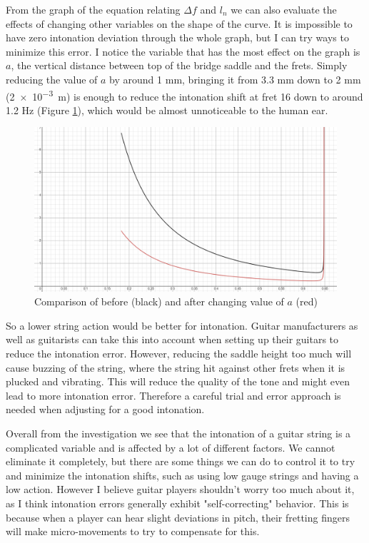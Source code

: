 From the graph of the equation relating $\Delta f$ and $l_n$ we can also evaluate the effects of changing other variables on the shape of the curve. It is impossible to have zero intonation deviation through the whole graph, but I can try ways to minimize this error. I notice the variable that has the most effect on the graph is $a$, the vertical distance between top of the bridge saddle and the frets. Simply reducing the value of $a$ by around 1 mm, bringing it from 3.3 mm down to 2 mm (\SI{2e-3}{m}) is enough to reduce the intonation shift at fret 16 down to around 1.2 Hz (Figure \ref{fig12}), which would be almost unnoticeable to the human ear. \par
\begin{figure}[!h]
    \includegraphics[width = \textwidth]{./ee/compare_graph_a.png}
    \caption{Comparison of before (black) and after changing value of $a$ (red)} \label{fig12}
\end{figure}
\FloatBarrier
So a lower string action would be better for intonation. Guitar manufacturers as well as guitarists can take this into account when setting up their guitars to reduce the intonation error. However, reducing the saddle height too much will cause buzzing of the string, where the string hit against other frets when it is plucked and vibrating. This will reduce the quality of the tone and might even lead to more intonation error. Therefore a careful trial and error approach is needed when adjusting for a good intonation. \par
Overall from the investigation we see that the intonation of a guitar string is a complicated variable and is affected by a lot of different factors. We cannot eliminate it completely, but there are some things we can do to control it to try and minimize the intonation shifts, such as using low gauge strings and having a low action. However I believe guitar players shouldn't worry too much about it, as I think intonation errors generally exhibit "self-correcting" behavior. This is because when a player can hear slight deviations in pitch, their fretting fingers will make micro-movements to try to compensate for this.